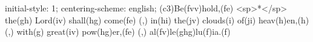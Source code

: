 initial-style: 1;
centering-scheme: english;
(c3)Be(fvv)hold,(fe) <sp>*</sp> the(gh) Lord(iv) shall(hg) come(fe) (,) in(hi) the(jv) clouds(i) of(ji) heav(h)en,(h) (,) with(g) great(iv) pow(hg)er,(fe) (,) al(fv)le(ghg)lu(f)ia.(f)
